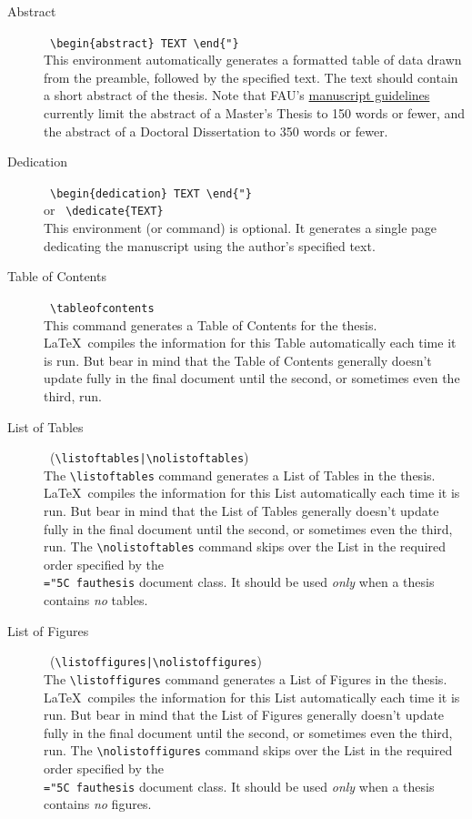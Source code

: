 \documentclass[11pt]{article}
\newcommand\guide{{http://www.fau.edu/graduate/forms-and-procedures/degree-completion/thesis-and-dissertation/index.php}}
\newcommand\code[1]{{\normalfont\texttt{\let\dv\textsl\chardef\\="5C #1}}}
\begin{document}
\begin{description}
\item[Abstract] \dotfill\ \verb=\begin{abstract} TEXT \end{"}=\\
This environment automatically generates a formatted table of data drawn from the preamble, followed by the specified text.  The text should contain a short abstract of the thesis.  Note that FAU's 
\href\guide{manuscript guidelines} 
currently limit the abstract of a Master's Thesis to 150 words or fewer, and the abstract of a Doctoral Dissertation to 350 words or fewer.

\item[\llap{*}Dedication] \dotfill\ \verb=\begin{dedication} TEXT \end{"}=\\
or \dotfill\ \verb=\dedicate{TEXT}=\\
This environment (or command) is optional.  It generates a single page dedicating the manuscript using the author's specified text.

\item[Table of Contents] \dotfill\ \verb=\tableofcontents=\\
This command generates a Table of Contents for the thesis.  \LaTeX\ compiles the information for this Table automatically each time it is run.  But bear in mind that the Table of Contents generally doesn't update fully in the final document until the second, or sometimes even the third, run.

\item[List of Tables] \dotfill\ (\verb=\listoftables|\nolistoftables=)\\
The \verb=\listoftables= command generates a List of Tables in the thesis.  \LaTeX\ compiles the information for this List automatically each time it is run.  But bear in mind that the List of Tables generally doesn't update fully in the final document until the second, or sometimes even the third, run.  The \verb=\nolistoftables= command skips over the List in the required order specified by the \code{fauthesis} document class.  It should be used \textit{only} when a thesis contains \textit{no} tables.

\item[List of Figures] \dotfill\ (\verb=\listoffigures|\nolistoffigures=)\\
The \verb=\listoffigures= command generates a List of Figures in the thesis.  \LaTeX\ compiles the information for this List automatically each time it is run.  But bear in mind that the List of Figures generally doesn't update fully in the final document until the second, or sometimes even the third, run.  The \verb=\nolistoffigures= command skips over the List in the required order specified by the \code{fauthesis} document class.  It should be used \textit{only} when a thesis contains \textit{no} figures.

\end{description}
\end{document}
